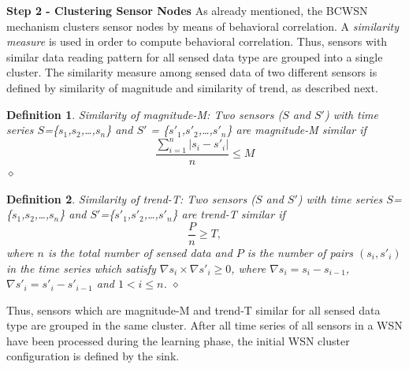\documentclass{acm_proc_article-sp}
\newcommand{\dia}{\hspace*{.1cm} \hfill $\diamond$}
\begin{document}
{\bf Step 2 - Clustering Sensor Nodes}
As already mentioned, the BCWSN mechanism clusters sensor nodes by means of
behavioral correlation. A \textit{similarity measure} \cite{Liu2007} is used in
order to compute behavioral correlation. Thus, sensors with similar data reading
pattern for all sensed data type are grouped into a single cluster.
The similarity measure among sensed data of two different sensors is defined by
similarity of magnitude and similarity of trend, as described next.
\vspace*{-.3cm}

\newtheorem{defini}{Definition}

\begin{defini}
Similarity of magnitude-M: Two sensors ($S$ and $S'$) with time series
$S$=\{$s_{1}$,$s_{2}$,\ldots,$s_{n}$\} and
$S'$ = \{$s'_{1}$,$s'_{2}$,\ldots,$s'_{n}$\} are magnitude-M similar if 
\begin{equation}
\label{equ:magni}
\frac{\sum_{i=1}^{n} |s_{i}-s'_{i}|}{n} \leq M
\end{equation}
\dia
\end{defini}
\vspace*{-.9cm}

\begin{defini}
Similarity of trend-T: Two sensors ($S$ and $S'$) with time series
$S$=\{$s_{1}$,$s_{2}$,\ldots,$s_{n}$\} and
$S'$=\{$s'_{1}$,$s'_{2}$,\ldots,$s'_{n}$\} are trend-T similar if 
\begin{equation}
\label{equ:trend}
\frac{P}{n} \geq T,
\end{equation}
where $n$ is the total number of sensed data and $P$ is the number of pairs
$(s_{i},s'_{i})$ in the time series which satisfy $\nabla s_{i} \times \nabla
s'_{i} \geq 0$, where $\nabla s_{i} = s_{i} - s_{i-1}$, $\nabla
s'_{i} = s'_{i} - s'_{i-1}$ and $1 < i \leq n$.
\dia
\end{defini}
\vspace*{-.5cm}

Thus, sensors which are magnitude-M and trend-T similar for all sensed data
type are grouped in the same cluster. After all time series of all sensors
in a WSN have been processed during the learning phase, the initial WSN cluster
configuration is defined by the sink.
\vspace*{-.3cm}
\end{document}
